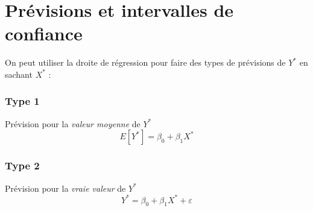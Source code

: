 \documentclass[11pt,french]{report}
\begin{document}
\section{Prévisions et intervalles de confiance}
On peut utiliser la droite de régression pour faire des types de prévisions de $Y^*$ en sachant $X^*$ :
\subsubsection*{Type 1}
Prévision pour la \emph{valeur moyenne} de $Y^*$
$$
E[Y^*] = \beta_0 + \beta_1X^*
$$

\subsubsection*{Type 2}
Prévision pour la \emph{vraie valeur} de $Y^*$
$$
Y^* = \beta_0 + \beta_1X^* + \varepsilon
$$
\end{document}
